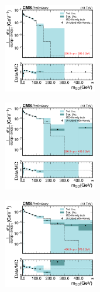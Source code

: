       \begin{figure}[htp!]
        \begin{subfigure}
          \centering
          \includegraphics[width=0.45\textwidth]{figures/multijet/unfolding/dijet/closure_herwig_binnedResult_groomed_0.pdf}
        \end{subfigure} 
        \begin{subfigure}
          \centering
          \includegraphics[width=0.45\textwidth]{figures/multijet/unfolding/dijet/closure_herwig_binnedResult_groomed_1.pdf}
        \end{subfigure}
        \begin{subfigure}
          \centering
          \includegraphics[width=0.45\textwidth]{figures/multijet/unfolding/dijet/closure_herwig_binnedResult_groomed_2.pdf}
        \end{subfigure} 
        \begin{subfigure}

\end{subfigure}
\end{figure}
